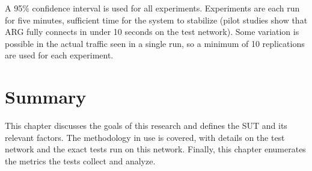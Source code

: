 \par A 95\% confidence interval is used for all experiments. Experiments are each run for five minutes, sufficient time for the system to stabilize (pilot studies show that \ac{ARG} fully connects in under 10 seconds on the test network). Some variation is possible in the actual traffic seen in a single run, so a minimum of 10 replications are used for each experiment.

\section{Summary}
\label{sec:method_summary}
\par This chapter discusses the goals of this research and defines the \ac{SUT} and its relevant factors. The methodology in use is covered, with details on the test network and the exact tests run on this network. Finally, this chapter enumerates the metrics the tests collect and analyze. 

